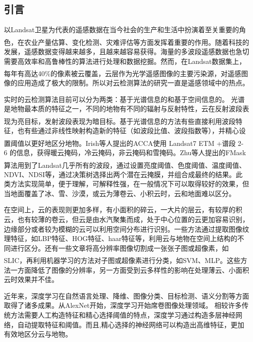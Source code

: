\documentclass[10pt]{ctexart}
\newcommand{\upcite}[1]{\textsuperscript{\textsuperscript{\cite{#1}}}}
\begin{document}
\begin{multicols}{2} 

\setcounter{section}{0} %
\section*{引言}
以Landsat卫星为代表的遥感数据在当今社会的生产和生活中扮演着至关重要的角色，在农业产量估算\upcite{prasad2006crop}、变化检测\upcite{verbesselt2010detecting}、灾难评估\upcite{joyce2009review}等方面发挥着重要的作用。随着科技的发展，遥感数据变得越来越多，且越来越容易获得。海量的多波段遥感数据也急切需要高效率和高鲁棒性的算法进行处理和数据挖掘。然而，在Landsat数据集上，每年有高达40\%的像素被云覆盖\upcite{ju2008availability}，云层作为光学遥感图像的主要污染源，对遥感图像的应用造成了极大的限制。所以对云检测算法的研究一直是遥感领域中的热点。

实时的云检测算法目前可以分为两类：基于光谱信息的和基于空间信息的。
光谱是地物最本质的特征之一，不同的地物有不同的辐射与反射特性，云在反射波段表现为亮目标，发射波段表现为暗目标。基于光谱信息的方法\upcite{sun2018cloud}有些直接利用波段特征，也有些通过非线性映射构造新的特征（如波段比值、波段指数等），并精心设置阈值以更好地区分地物。Irish等人\upcite{irish2006characterization}提出的ACCA使用 Landsat7 ETM +谱段 2- 6 的信息，获得暖云掩码，冷云掩码，非云掩码和雪掩码。Zhu等人提出的FMask算法\upcite{zhu2012object}用到了Landsat几乎所有的波段，通过设置亮度阈值、色度阈值、温度阈值、NDVI、NDSI等，通过决策树选择出两个潜在云掩膜，并组合成最终的结果。此类方法实现简单，便于理解，可解释性强，在一般情况下可以取得较好的效果，但当地面覆盖了冰、雪、沙漠，或云为薄卷云、小积云时，云和地面难以区分。

在空间上，云的表现则更加多样，有小面积的碎云，一大片的层云，有较厚的积云，也有较薄的卷云，但云是由水汽聚集而成，处于中心位置的云更加容易识别，边缘部分或者较为模糊的云可以利用空间分布进行识别。一些方法通过提取图像纹理特征，如LBP特征、HOG特征、haar特征等，利用云与地物在空间上结构的不同进行区分。还有一些文章将高分辨率图像切割成一张张子图或超像素，如SLIC\upcite{achanta2012slic}，再利用机器学习的方法对子图或超像素进行分类，如SVM\upcite{lee2004cloud}、MLP\upcite{tian1999study}。这些方法一方面降低了图像的分辨率，另一方面受到云多样性的影响在处理薄云、小面积云时效果并不佳。

近年来，深度学习在自然语言处理、降维、图像分类、目标检测、语义分割等方面取得了诸多成果。从AlexNet开始，深度学习开始席卷图像处理领域。
相较许多传统方法需要人工构造特征和精心选择阈值的特点，深度学习通过构造多层神经网络，自动提取特征和阈值。而且,精心选择的神经网络可以构造出高维特征，更加有效地区分云与地物。


\end{multicols}
\end{document}
